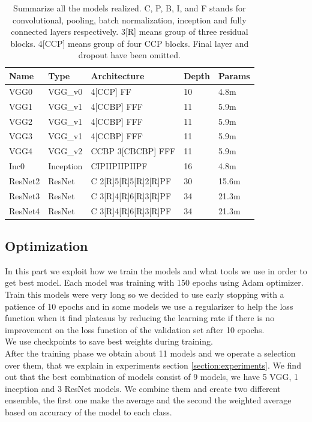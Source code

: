 \documentclass[10pt,twocolumn,letterpaper]{article}
\begin{document}
\begin{table}[]

   \scriptsize
   \begin{tabular}{L{0.8cm}C{0.6cm}C{3.4cm}C{0.6cm}C{0.8cm}}
      \hline
      Name    & Type      & Architecture         & Depth & Params \\
      \hline\hline
      VGG0    & VGG\_v0   & 4[CCP] FF            & 10    & 4.8m   \\
      VGG1    & VGG\_v1   & 4[CCBP] FFF          & 11    & 5.9m   \\
      VGG2    & VGG\_v1   & 4[CCBP] FFF          & 11    & 5.9m   \\
      VGG3    & VGG\_v1   & 4[CCBP] FFF          & 11    & 5.9m   \\
      VGG4    & VGG\_v2   & CCBP 3[CBCBP] FFF    & 11    & 5.9m   \\
      Inc0    & Inception & CIPIIPIIPIIPF        & 16    & 4.8m   \\
      ResNet2 & ResNet    & C 2[R]5[R]5[R]2[R]PF & 30    & 15.6m  \\
      ResNet3 & ResNet    & C 3[R]4[R]6[R]3[R]PF & 34    & 21.3m  \\
      ResNet4 & ResNet    & C 3[R]4[R]6[R]3[R]PF & 34    & 21.3m  \\
      \hline
   \end{tabular}
   \label{model:stable}
   \caption{Summarize all the models realized. C, P, B, I, and F stands for convolutional, pooling, batch normalization, inception and fully connected layers respectively. 3[R] means group of three residual blocks. 4[CCP] means group of four CCP blocks. Final layer and dropout have been omitted.}

\end{table}

\subsection*{Optimization}
In this part we exploit how we train the models and what tools we use in order to get best model. Each model was training with 150 epochs using Adam optimizer. Train this models were very long so we decided to use early stopping with a patience of 10 epochs and in some models we use a regularizer to help the loss function when it find plateaus by reducing the learning rate if there is no improvement on the loss function of the validation set after 10 epochs.\\
We use checkpoints to save best weights during training.\\
After the training phase we obtain about 11 models and we operate a selection over them, that we explain in experiments section \ref{section:experiments}. We find out that the best combination of models consist of 9 models, we have 5 VGG, 1 inception and 3 ResNet models. We combine them and create two different ensemble, the first one make the average and the second the weighted average based on accuracy of the model to each class.
\end{document}
